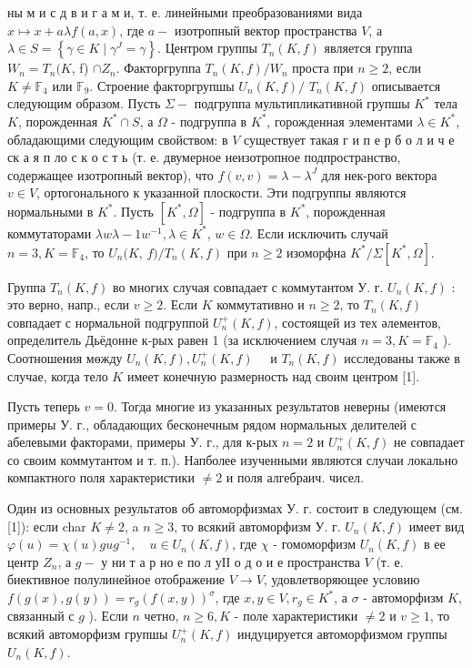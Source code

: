 \documentclass[10pt]{article}
\begin{document}
ны м и с д в и г а м и, т. е. линейными преобразованиями вида $x \mapsto x+a \lambda f(a, x)$, где $a-$ изотропный вектор пространства $V$, а $\lambda \in S=\left\{\gamma \in K \mid \gamma^{J}=\gamma\right\}$. Центром группы $T_{n}(K, f)$ является группа $W_{n}=T_{n}(K$, f) $\cap Z_{n}$. Факторгруппа $T_{n}(K, f) / W_{n}$ проста при $n \geqslant 2$, если $K \neq \mathbb{F}_{4}$ или $\mathbb{F}_{9}$. Строение факторгрупшы $U_{n}(K, f) /$ $T_{n}(K, f)$ описывается следующим образом. Пусть $\Sigma-$ подгруппа мультипликативной групшы $K^{*}$ тела $K$, порожденная $K^{*} \cap S$, а $\Omega$ - подгруппа в $K^{*}$, горожденная элементами $\lambda \in K^{*}$, обладающими следующим свойством: в $V$ существует такая г и п е р б о л и ч е ск а я п ло с к о с т ь (т. е. двумерное неизотропное подпространство, содержащее изотропный вектор), что $f(v, v)=\lambda-\lambda^{J}$ для нек-рого вектора $v \in V$, ортогонального к указанной плоскости. Эти подгруппы являются нормальными в $K^{*}$. Пусть $\left[K^{*}, \Omega\right]$ - подгруппа в $K^{*}$, порожденная коммутаторами $\lambda w \lambda-1 w^{-1}, \lambda \in K^{*}$, $w \in \Omega$. Если исключить случай $n=3, K=\mathbb{F}_{4}$, то $U_{n}(K$, $f) / T_{n}(K, f)$ при $n \geqslant 2$ изоморфна $K^{*} / \Sigma\left[K^{*}, \Omega\right]$.



Группа $T_{n}(K, f)$ во многих случая совпадает с коммутантом У. г. $U_{n}(K, f)$ : это верно, напр., если $v \geqslant 2$. Если $K$ коммутативно и $n \geqslant 2$, то $T_{n}(K, f)$ совпадает с нормальной подгруппой $U_{n}^{+}(K, f)$, состоящей из тех әлементов, определитель Дьёдонне к-рых равен 1 (за исключением случая $n=3, K=\mathbb{F}_{4}$ ). Соотношения мөжду $U_{n}(K, f), U_{n}^{+}(K, f) \quad$ и $T_{n}(K, f)$ исследованы также в случае, когда тело $K$ имеет конечную размерность над своим центром [1].



Пусть теперь $v=0$. Тогда многие из указанных результатов неверны (имеются примеры У. г., обладающих бесконечным рядом нормальных делителей с абелевыми факторами, примеры У. г., для к-рых $n=2$ и $U_{n}^{+}(K, f)$ не совпадает со своим коммутантом и т. п.). Напболее изученными являются случаи локально компактного поля характеристики $\neq 2$ и поля алгебраич. чисел.



Один из основных результатов об автоморфизмах У. г. состоит в следующем (см. [1]): если char $K \neq 2$, a $n \geqslant 3$, то всякий автоморфизм У. г. $U_{n}(K, f)$ имеет вид $\varphi(u)=\chi(u) g u g^{-1}, \quad u \in U_{n}(K, f)$, где $\chi$ - гомоморфизм $U_{n}(K, f)$ в ее центр $Z_{n}$, а $g-$ у ни т а р но е по л уІІ о д о и е пространства $V$ (т. е. биективное полулинейное отображение $V \rightarrow V$, удовлетворяющее условию $f(g(x), g(y))=r_{g}(f(x, y))^{\sigma}$, где $x, y \in V, r_{g} \in K^{*}$, а $\sigma$ - автоморфизм $K$, связанный с $g$ ). Если $n$ четно, $n \geqslant 6, K$ - поле характеристики $\neq 2$ и $v \geqslant 1$, то всякий автоморфизм групшы $U_{n}^{+}(K, f)$ индуцируется автоморфизмом группы $U_{n}(K, f)$.
\end{document}
